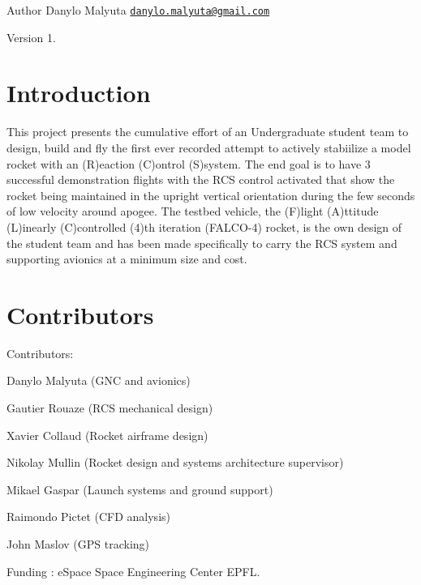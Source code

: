 \begin{DoxyAuthor}{Author}
Danylo Malyuta \href{mailto:danylo.malyuta@gmail.com}{\tt danylo.\-malyuta@gmail.\-com} 
\end{DoxyAuthor}
\begin{DoxyVersion}{Version}
1.
\end{DoxyVersion}
\hypertarget{index_Introduction}{}\section{Introduction}\label{index_Introduction}
This project presents the cumulative effort of an Undergraduate student team to design, build and fly the first ever recorded attempt to actively stabiilize a model rocket with an (R)eaction (C)ontrol (S)system. The end goal is to have 3 successful demonstration flights with the R\-C\-S control activated that show the rocket being maintained in the upright vertical orientation during the few seconds of low velocity around apogee. The testbed vehicle, the (F)light (A)ttitude (L)inearly (C)controlled (4)th iteration (F\-A\-L\-C\-O-\/4) rocket, is the own design of the student team and has been made specifically to carry the R\-C\-S system and supporting avionics at a minimum size and cost.\hypertarget{index_Contributors}{}\section{Contributors}\label{index_Contributors}
Contributors\-:
\begin{DoxyItemize}
\item Danylo Malyuta (G\-N\-C and avionics)
\item Gautier Rouaze (R\-C\-S mechanical design)
\item Xavier Collaud (Rocket airframe design)
\item Nikolay Mullin (Rocket design and systems architecture supervisor)
\item Mikael Gaspar (Launch systems and ground support)
\item Raimondo Pictet (C\-F\-D analysis)
\item John Maslov (G\-P\-S tracking)
\end{DoxyItemize}

Funding \-: e\-Space Space Engineering Center E\-P\-F\-L.

